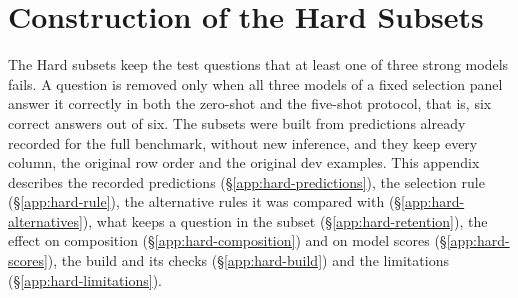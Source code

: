 %
%

\providecommand{\HardFigDir}{figures}

\section{Construction of the Hard Subsets}
\label{app:hard}

The Hard subsets keep the test questions that at least one of three strong
models fails. A question is removed only when all three models of a fixed
selection panel answer it correctly in both the zero-shot and the five-shot
protocol, that is, six correct answers out of six. The subsets were built
from predictions already recorded for the full benchmark, without new
inference, and they keep every column, the original row order and the
original dev examples. This appendix describes the recorded predictions
(\S\ref{app:hard-predictions}), the selection rule
(\S\ref{app:hard-rule}), the alternative rules it was compared with
(\S\ref{app:hard-alternatives}), what keeps a question in the subset
(\S\ref{app:hard-retention}), the effect on composition
(\S\ref{app:hard-composition}) and on model scores
(\S\ref{app:hard-scores}), the build and its checks
(\S\ref{app:hard-build}) and the limitations
(\S\ref{app:hard-limitations}).

